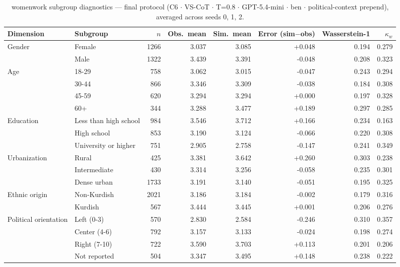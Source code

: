 \begin{table}[htb]
\centering
\small
\caption{womenwork subgroup diagnostics --- final protocol (C6 $\cdot$ VS-CoT $\cdot$ T{=}0.8 $\cdot$ GPT-5.4-mini $\cdot$ ben $\cdot$ political-context prepend), averaged across seeds 0, 1, 2.}
\label{tab:appG_womenwork_subgroups}
\begin{adjustbox}{max width=\textwidth}
\begin{tabular}{llrrrrrr}
\toprule
Dimension & Subgroup & $n$ & Obs.\ mean & Sim.\ mean & Error (sim$-$obs) & Wasserstein-1 & $\kappa_w$ \\
\midrule
Gender & Female & 1266 & 3.037 & 3.085 & +0.048 & 0.194 & 0.279 \\
 & Male & 1322 & 3.439 & 3.391 & -0.048 & 0.208 & 0.323 \\
Age & 18-29 & 758 & 3.062 & 3.015 & -0.047 & 0.243 & 0.294 \\
 & 30-44 & 866 & 3.346 & 3.309 & -0.038 & 0.184 & 0.308 \\
 & 45-59 & 620 & 3.294 & 3.294 & +0.000 & 0.197 & 0.328 \\
 & 60+ & 344 & 3.288 & 3.477 & +0.189 & 0.297 & 0.285 \\
Education & Less than high school & 984 & 3.546 & 3.712 & +0.166 & 0.234 & 0.163 \\
 & High school & 853 & 3.190 & 3.124 & -0.066 & 0.220 & 0.308 \\
 & University or higher & 751 & 2.905 & 2.758 & -0.147 & 0.241 & 0.349 \\
Urbanization & Rural & 425 & 3.381 & 3.642 & +0.260 & 0.303 & 0.238 \\
 & Intermediate & 430 & 3.314 & 3.256 & -0.058 & 0.235 & 0.301 \\
 & Dense urban & 1733 & 3.191 & 3.140 & -0.051 & 0.195 & 0.325 \\
Ethnic origin & Non-Kurdish & 2021 & 3.186 & 3.184 & -0.002 & 0.179 & 0.316 \\
 & Kurdish & 567 & 3.444 & 3.445 & +0.001 & 0.206 & 0.276 \\
Political orientation & Left (0-3) & 570 & 2.830 & 2.584 & -0.246 & 0.310 & 0.357 \\
 & Center (4-6) & 792 & 3.157 & 3.133 & -0.024 & 0.198 & 0.274 \\
 & Right (7-10) & 722 & 3.590 & 3.703 & +0.113 & 0.201 & 0.206 \\
 & Not reported & 504 & 3.347 & 3.495 & +0.148 & 0.238 & 0.222 \\
\bottomrule
\end{tabular}
\end{adjustbox}
\end{table}
